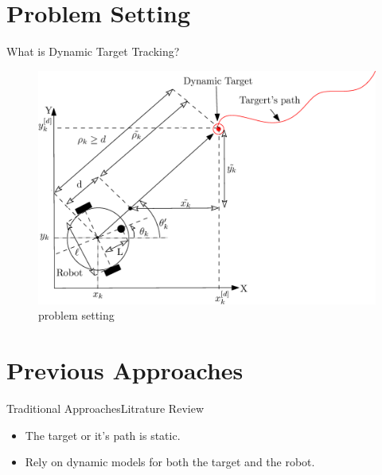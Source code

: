 \documentclass{beamer}
\begin{document}
\section{Problem Setting}
\begin{frame}{What is Dynamic Target Tracking?}
\begin{center}
\begin{figure}
\includegraphics[scale=0.3]{figs/ipe/LFMICSetup.eps}
\caption{problem setting}
\end{figure}
\end{center}
\end{frame}
%

\section{Previous Approaches}
\begin{frame}{Traditional Approaches}{Litrature Review}
\begin{itemize}
\item The target or it's path is static. 
\item Rely on dynamic models for both the target and the robot.
\end{itemize}
\end{frame}
\end{document}
